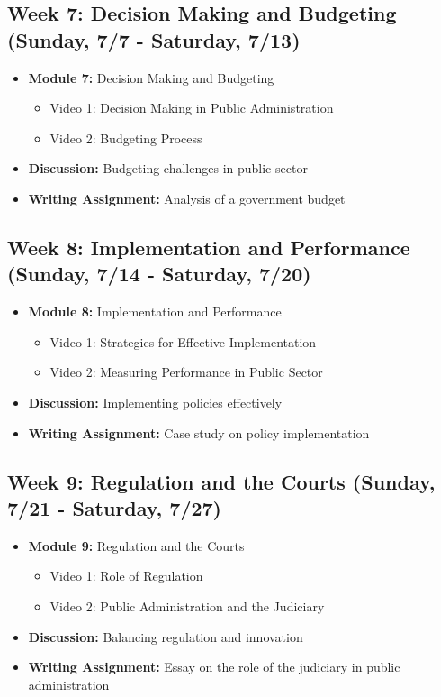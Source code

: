 \documentclass[12pt, letterpaper]{article}
\begin{document}
\subsection*{Week 7: Decision Making and Budgeting (Sunday, 7/7 - Saturday, 7/13)}
\begin{itemize}
    \item \textbf{Module 7:} Decision Making and Budgeting
    \begin{itemize}
        \item Video 1: Decision Making in Public Administration
        \item Video 2: Budgeting Process
    \end{itemize}
    \item \textbf{Discussion:} Budgeting challenges in public sector
    \item \textbf{Writing Assignment:} Analysis of a government budget
\end{itemize}

\subsection*{Week 8: Implementation and Performance (Sunday, 7/14 - Saturday, 7/20)}
\begin{itemize}
    \item \textbf{Module 8:} Implementation and Performance
    \begin{itemize}
        \item Video 1: Strategies for Effective Implementation
        \item Video 2: Measuring Performance in Public Sector
    \end{itemize}
    \item \textbf{Discussion:} Implementing policies effectively
    \item \textbf{Writing Assignment:} Case study on policy implementation
\end{itemize}

\subsection*{Week 9: Regulation and the Courts (Sunday, 7/21 - Saturday, 7/27)}
\begin{itemize}
    \item \textbf{Module 9:} Regulation and the Courts
    \begin{itemize}
        \item Video 1: Role of Regulation
        \item Video 2: Public Administration and the Judiciary
    \end{itemize}
    \item \textbf{Discussion:} Balancing regulation and innovation
    \item \textbf{Writing Assignment:} Essay on the role of the judiciary in public administration
\end{itemize}
\end{document}
